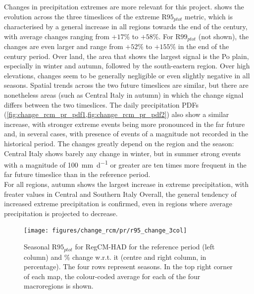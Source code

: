 Changes in precipitation extremes are more relevant for this project.  shows the evolution across the three timeslices of the extreme $\textrm{R95}_{ptot}$ metric, which is characterised by a general increase in all regions towards the end of the century, with average changes ranging from $+17\%$ to $+58\%$.
For $\textrm{R99}_{ptot}$ (not shown), the changes are even larger and range from $+52\%$ to $+155\%$ in the end of the century period.
Over land, the area that shows the largest signal is the Po plain, especially in winter and autumn, followed by the south-eastern region.
Over high elevations, changes seem to be generally negligible or even slightly negative in all seasons.
Spatial trends across the two future timeslices are similar, but there are nonetheless areas (such as Central Italy in autumn) in which the change signal differs between the two timeslices.
The daily precipitation PDFs (\cref{fig:change_rcm_pr_pdf1,fig:change_rcm_pr_pdf2}) also show a similar increase, with stronger extreme events being more pronounced in the far future and, in several cases, with presence of events of a magnitude not recorded in the historical period.
The changes greatly depend on the region and the season:  Central Italy shows barely any change in winter, but in summer strong events with a magnitude of \SI{100}{\milli\metre\per\day} or greater are ten times more frequent in the far future timeslice than in the reference period.\\
For all regions, autumn shows the largest increase in extreme precipitation, with freater values in Central and Southern Italy
Overall, the general tendency of increased extreme precipitation is confirmed, even in regions where average precipitation is projected to decrease.
\begin{figure}
    \centering
    \texttt{[image: figures/change\_rcm/pr/r95\_change\_3col]}
    \decoRule
    \caption[Validation of extreme events ($\textrm{R95}_{ptot}$)]{
        Seasonal $\textrm{R95}_{ptot}$ for RegCM-HAD for the reference period (left column) and \% change w.r.t. it (centre and right column, in percentage). The four rows represent seasons. In the top right corner of each map, the colour-coded average for each of the four macroregions is shown.
    } \label{fig:change_rcm_pr_r95}
\end{figure}
